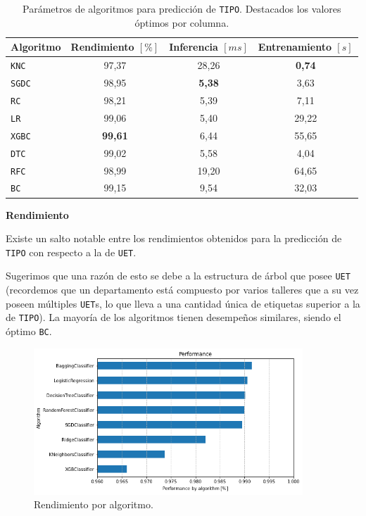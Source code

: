 \documentclass[a4paper,12pt]{article}
\begin{document}
		\begin{table}[H]
			\centering
			\begin{tabular}{lccc}
				\hline
				\multicolumn{1}{c}{\textbf{Algoritmo}} &
				\multicolumn{1}{c}{\textbf{Rendimiento $[\%]$}} &
				\multicolumn{1}{c}{\textbf{Inferencia $[ms]$}} &
				\multicolumn{1}{c}{\textbf{Entrenamiento $[s]$}} \\ 
				\hline
				\texttt{KNC}  & 97,37          & 28,26         & \textbf{0,74} \\
				\texttt{SGDC} & 98,95          & \textbf{5,38} & 3,63          \\
				\texttt{RC}   & 98,21          & 5,39          & 7,11          \\
				\texttt{LR}   & 99,06          & 5,40          & 29,22         \\
				\texttt{XGBC} & \textbf{99,61} & 6,44          & 55,65         \\
				\texttt{DTC}  & 99,02          & 5,58          & 4,04          \\
				\texttt{RFC}  & 98,99          & 19,20         & 64,65         \\
				\texttt{BC}   & 99,15          & 9,54          & 32,03         \\ 
				\hline
			\end{tabular}
			\caption{Parámetros de algoritmos para predicción de \texttt{TIPO}. Destacados los valores óptimos por columna.}
			\label{tab:tipo-parameters-algo}
		\end{table}		
				
			\clearpage				
				
		\textbf{Rendimiento}
				
		Existe un salto notable entre los rendimientos obtenidos para la predicción de \texttt{TIPO} con respecto a la de \texttt{UET}. 
		
		Sugerimos que una razón de esto se debe a la estructura de árbol que posee \texttt{UET} (recordemos que un departamento está compuesto por varios talleres que a su vez poseen múltiples \texttt{UET}s, lo que lleva a una cantidad única de etiquetas superior a la de \texttt{TIPO}). La mayoría de los algoritmos tienen desempeños similares, siendo el óptimo \texttt{BC}.
				
		\begin{figure}[H]
			\begin{center}
				\includegraphics[width=0.9\textwidth]{perfo_uet_by_algo.png}
				\caption{Rendimiento por algoritmo.}
				\label{fig:perfo_uet_by_algo}
			\end{center}
		\end{figure}
				
\end{document}
